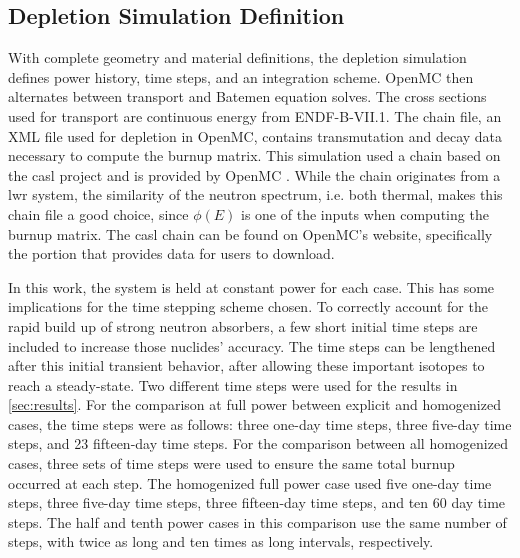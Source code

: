 \documentclass[letterpaper]{physor2024}
\begin{document}
\subsection{Depletion Simulation Definition}\label{sec:depl_sim}
With complete geometry and material definitions, the depletion simulation defines power history, time steps, and an integration scheme. OpenMC then alternates between transport and Batemen equation solves. The cross sections used for transport are continuous energy from ENDF-B-VII.1. The chain file, an XML file used for depletion in OpenMC, contains transmutation and decay data necessary to compute the burnup matrix. This simulation used a chain based on the \gls{casl} project \cite{CASL-report} and is provided by OpenMC \cite{openmc-chains}. While the chain originates from a \gls{lwr} system, the similarity of the neutron spectrum, i.e. both thermal, makes this chain file a good choice, since $\phi(E)$ is one of the inputs when computing the burnup matrix. The \gls{casl} chain can be found on OpenMC's website, specifically the portion that provides data for users to download.

In this work, the system is held at constant power for each case. This has some implications for the time stepping scheme chosen. To correctly account for the rapid build up of strong neutron absorbers, a few short initial time steps are included to increase those nuclides' accuracy. The time steps can be lengthened after this initial transient behavior, after allowing these important isotopes to reach a steady-state. Two different time steps were used for the results in \cref{sec:results}. For the comparison at full power between explicit and homogenized cases, the time steps were as follows: three one-day time steps, three five-day time steps, and 23 fifteen-day time steps. For the comparison between all homogenized cases, three sets of time steps were used to ensure the same total burnup occurred at each step. The homogenized full power case used five one-day time steps, three five-day time steps, three fifteen-day time steps, and ten 60 day time steps. The half and tenth power cases in this comparison use the same number of steps, with twice as long and ten times as long intervals, respectively.
\end{document}
